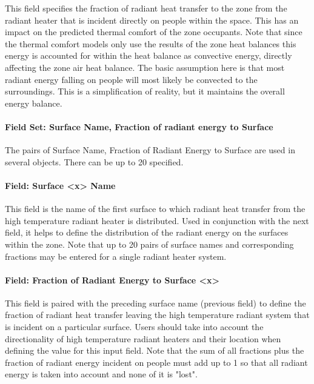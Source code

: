This field specifies the fraction of radiant heat transfer to the zone from the radiant heater that is incident directly on people within the space. This has an impact on the predicted thermal comfort of the zone occupants. Note that since the thermal comfort models only use the results of the zone heat balances this energy is accounted for within the heat balance as convective energy, directly affecting the zone air heat balance. The basic assumption here is that most radiant energy falling on people will most likely be convected to the surroundings. This is a simplification of reality, but it maintains the overall energy balance.

\paragraph{Field Set: Surface Name, Fraction of radiant energy to Surface}\label{field-set-surface-name-fraction-of-radiant-energy-to-surface-3}

The pairs of Surface Name, Fraction of Radiant Energy to Surface are used in several objects. There can be up to 20 specified.

\paragraph{Field: Surface \textless{}x\textgreater{} Name}\label{field-surface-x-name-3}

This field is the name of the first surface to which radiant heat transfer from the high temperature radiant heater is distributed. Used in conjunction with the next field, it helps to define the distribution of the radiant energy on the surfaces within the zone. Note that up to 20 pairs of surface names and corresponding fractions may be entered for a single radiant heater system.

\paragraph{Field: Fraction of Radiant Energy to Surface \textless{}x\textgreater{}}\label{field-fraction-of-radiant-energy-to-surface-x-2}

This field is paired with the preceding surface name (previous field) to define the fraction of radiant heat transfer leaving the high temperature radiant system that is incident on a particular surface. Users should take into account the directionality of high temperature radiant heaters and their location when defining the value for this input field. Note that the sum of all fractions plus the fraction of radiant energy incident on people must add up to 1 so that all radiant energy is taken into account and none of it is "lost".

